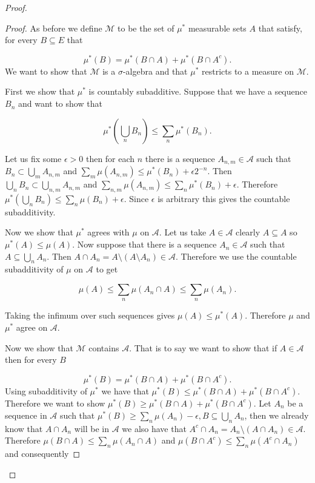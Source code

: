 \documentclass[
]{book}
\theoremstyle{definition}
\theoremstyle{definition}
\theoremstyle{definition}
\theoremstyle{definition}
\theoremstyle{remark}
\begin{document}
\begin{proof}
\begin{proof}
As before we define \(\mathscr{M}\) to be the set of \(\mu^*\) measurable sets \(A\) that satisfy, for every \(B \subseteq E\) that

\[ \mu^*(B) = \mu^*(B \cap A) + \mu^*(B \cap A^c).  \]
We want to show that \(\mathscr{M}\) is a \(\sigma\)-algebra and that \(\mu^*\) restricts to a measure on \(\mathscr{M}\).

First we show that \(\mu^*\) is countably subadditive. Suppose that we have a sequence \(B_n\) and want to show that

\[ \mu^*\left( \bigcup_n B_n\right) \leq \sum_n \mu^*(B_n). \]

Let us fix some \(\epsilon >0\) then for each \(n\) there is a sequence \(A_{n,m} \in \mathcal{A}\) such that \(B_n \subset \bigcup_m A_{n,m}\) and \(\sum_m \mu(A_{n,m}) \leq \mu^*(B_n) + \epsilon 2^{-n}\). Then \(\bigcup_n B_n \subset \bigcup_{n,m} A_{n,m}\) and \(\sum_{n,m}\mu(A_{n,m}) \leq \sum_n \mu^*(B_n) + \epsilon\). Therefore \(\mu^* \left( \bigcup_n B_n \right) \leq \sum_n \mu(B_n) + \epsilon\). Since \(\epsilon\) is arbitrary this gives the countable subadditivity.

Now we show that \(\mu^*\) agrees with \(\mu\) on \(\mathcal{A}\). Let us take \(A \in \mathcal{A}\) clearly \(A \subseteq A\) so \(\mu^*(A) \leq \mu(A)\). Now suppose that there is a sequence \(A_n \in \mathcal{A}\) such that \(A \subseteq \bigcup_n A_n\). Then \(A \cap A_n = A \setminus (A \setminus A_n) \in \mathcal{A}\). Therefore we use the countable subadditivity of \(\mu\) on \(\mathcal{A}\) to get

\[ \mu (A) \leq  \sum_n \mu(A_n \cap A) \leq \sum_n \mu(A_n).\]

Taking the infimum over such sequences gives \(\mu(A) \leq \mu^*(A)\). Therefore \(\mu\) and \(\mu^*\) agree on \(\mathcal{A}\).

Now we show that \(\mathscr{M}\) contains \(\mathcal{A}\). That is to say we want to show that if \(A \in \mathcal{A}\) then for every \(B\)

\[ \mu^*(B) = \mu^*(B \cap A) + \mu^*(B \cap A^c). \]
Using subadditivity of \(\mu^*\) we have that \(\mu^*(B) \leq \mu^*(B \cap A) + \mu^*(B \cap A^c)\). Therefore we want to show \(\mu^*(B) \geq \mu^*(B \cap A) + \mu^*(B \cap A^c)\). Let \(A_n\) be a sequence in \(\mathcal{A}\) such that \(\mu^*(B) \geq \sum_n \mu(A_n) - \epsilon, B \subseteq \bigcup_n A_n\), then we already know that \(A \cap A_n\) will be in \(\mathcal{A}\) we also have that \(A^c \cap A_n = A_n \setminus (A \cap A_n) \in \mathcal{A}\). Therefore \(\mu(B \cap A) \leq \sum_n \mu(A_n \cap A)\) and \(\mu(B \cap A^c) \leq \sum_n \mu(A^c \cap A_n)\) and consequently


\end{proof}
\end{proof}
\end{document}
